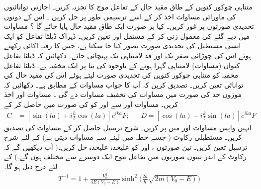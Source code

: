  
متناہی چوکور کنویں  کے طاق مقید حال کے تفاعل موج کا تجزیہ کریں۔ اجازتی توانائیوں کی ماورائی مساوات اخذ کر کے اسے ترسیمی طور پر حل کریں ۔ اس کے دونوں تحدیدی صورتوں پر غور کریں۔ کیا ہر صورت ایک طاق مقید حال پایا جائے گا ؟ 
 مساوات میں دیے گئے   کی معمول زنی کر کے   مستقل اور تعین کریں۔
ڈیراک ڈیلٹا تفاعل کو ایک ایسی مستطیل کی تحدیدی صورت تصور کیا جا سکتا ہے، جس کا رقبہ اکائی  رکھتے ہوئے اس کی چوڑائی صفر تک اور قد لامتناہی تک پہنچائی جائے۔ دکھائیں کہ ڈیلٹا تفاعل کنواں (مساوات) لامتناہی گہرا ہونے کے باوجود کی بنا پر ایک مخفیہ ہے۔ ڈیلٹا تفاعل مخفیہ کو متناہی چوکور کنویں  کی تحدیدی صورت لیتے ہوئے اس کی مقید حال کی توانائی تعین کریں۔ تصدیق کریں کہ آپ کا جواب مساوات کے مطابق ہے۔ دکھائیں کہ موزوں حد کی صورت میں مساوات کی تخفیف مساوات دے گی ۔
مساوات  اور  اخذ کریں۔ مساوات  اور سے  اور  کو  کی صورت میں حاصل کر کے
\begin{align*}
C&=[\sin(la)+i\frac{k}{l}\cos(la)]e^{ika}F; && D=[\cos(la)-i\frac{k}{l}\sin(la)]e^{ika}F
 \end{align*}
 انہیں واپس مساوات  اور  میں پر کریں۔ شرح ترسیل حاصل کر کے مساوات کی تصدیق کریں۔
مستطیلی رکاوٹ ( جسے خطہ میں لینے سے مساوات  دیتی ہے) کے لئے شرح ترسیل تعین کریں۔ تین صورتوں  ،
اور  کو علیحدہ علیحدہ حل کریں۔( آپ دیکھیں گے کہ رکاوٹ کے اندر تینوں صورتوں میں تفاعل موج ایک دوسرے سے مختلف ہوں گے۔)   کے لئے درج ذیل ہو گا۔
\begin{align*}
T^{-1}=1+\frac{V_{0}^2}{4E(V_{0}-E)}\sinh^{2}\Big(\frac{2a}{\hslash}\sqrt{2m(V_{0}-E)} \Big) 
\end{align*}
